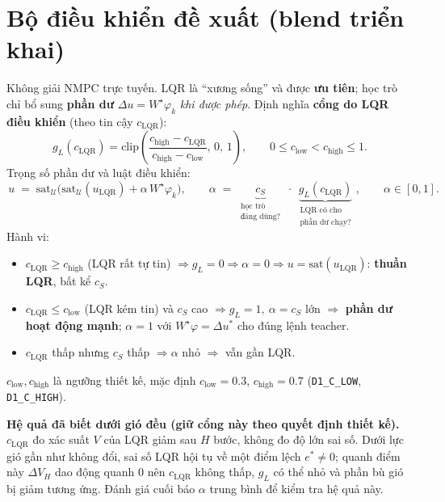 \documentclass[11pt]{article}
\newcommand{\cS}{c_{S}}
\newcommand{\cL}{c_{\mathrm{LQR}}}
\newcommand{\uL}{u_{\mathrm{LQR}}}
\begin{document}
\section{Bộ điều khiển đề xuất (blend triển khai)}
Không giải NMPC trực tuyến. LQR là ``xương sống'' và được \textbf{ưu tiên}; học trò chỉ bổ sung
\textbf{phần dư} $\Delta u=W^\star\varphi_k$ \emph{khi được phép}. Định nghĩa \textbf{cổng do LQR điều khiển}
(theo tin cậy $\cL$):
\[
g_L(\cL)=\mathrm{clip}\!\left(\frac{c_{\mathrm{high}}-\cL}{\,c_{\mathrm{high}}-c_{\mathrm{low}}\,},\,0,\,1\right),
\qquad 0\le c_{\mathrm{low}}<c_{\mathrm{high}}\le 1.
\]
Trọng số phần dư và luật điều khiển:
\[
\boxed{\,u \;=\; \mathrm{sat}_{\mathcal U}\!\big(\mathrm{sat}_{\mathcal U}(\uL) + \alpha\,W^\star\varphi_k\big),\qquad
\alpha \;=\; \underbrace{\cS}_{\substack{\text{học trò}\\\text{đáng dùng?}}}\;\cdot\;
\underbrace{g_L(\cL)}_{\substack{\text{LQR có cho}\\\text{phần dư chạy?}}}\,},\qquad \alpha\in[0,1].
\]
Hành vi:
\begin{itemize}[leftmargin=1.4em,itemsep=1pt]
\item $\cL\ge c_{\mathrm{high}}$ (LQR rất tự tin) $\Rightarrow g_L=0\Rightarrow \alpha=0\Rightarrow u=\mathrm{sat}(\uL)$:
\textbf{thuần LQR}, bất kể $\cS$.
\item $\cL\le c_{\mathrm{low}}$ (LQR kém tin) và $\cS$ cao $\Rightarrow g_L=1,\ \alpha=\cS$ lớn $\Rightarrow$
\textbf{phần dư hoạt động mạnh}; $\alpha=1$ với $W^\star\varphi=\Delta u^*$ cho đúng lệnh teacher.
\item $\cL$ thấp nhưng $\cS$ thấp $\Rightarrow \alpha$ nhỏ $\Rightarrow$ vẫn gần LQR.
\end{itemize}
$c_{\mathrm{low}},c_{\mathrm{high}}$ là ngưỡng thiết kế, mặc định $c_{\mathrm{low}}=0.3$, $c_{\mathrm{high}}=0.7$
(\texttt{D1\_C\_LOW}, \texttt{D1\_C\_HIGH}).

\noindent\textbf{Hệ quả đã biết dưới gió đều (giữ cổng này theo quyết định thiết kế).} $\cL$ đo xác suất
$V$ của LQR giảm sau $H$ bước, không đo độ lớn sai số. Dưới lực gió gần như không đổi, sai số LQR hội tụ về
một điểm lệch $e^*\neq0$; quanh điểm này $\Delta V_H$ dao động quanh $0$ nên $\cL$ không thấp, $g_L$ có thể
nhỏ và phần bù gió bị giảm tương ứng. Đánh giá cuối báo $\alpha$ trung bình để kiểm tra hệ quả này.
\end{document}
